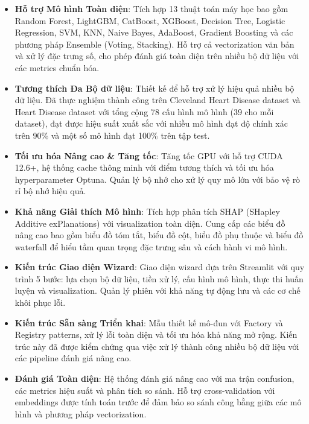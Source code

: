 \vspace{1em}
\begin{itemize}
    \item \textbf{Hỗ trợ Mô hình Toàn diện}: Tích hợp 13 thuật toán máy học bao gồm Random Forest, LightGBM, CatBoost, XGBoost, Decision Tree, Logistic Regression, SVM, KNN, Naive Bayes, AdaBoost, Gradient Boosting và các phương pháp Ensemble (Voting, Stacking). Hỗ trợ cả vectorization văn bản và xử lý đặc trưng số, cho phép đánh giá toàn diện trên nhiều bộ dữ liệu với các metrics chuẩn hóa.
    
    \item \textbf{Tương thích Đa Bộ dữ liệu}: Thiết kế để hỗ trợ xử lý hiệu quả nhiều bộ dữ liệu. Đã thực nghiệm thành công trên Cleveland Heart Disease dataset và Heart Disease dataset với tổng cộng 78 cấu hình mô hình (39 cho mỗi dataset), đạt được hiệu suất xuất sắc với nhiều mô hình đạt độ chính xác trên 90\% và một số mô hình đạt 100\% trên tập test.
    
    \item \textbf{Tối ưu hóa Nâng cao \& Tăng tốc}: Tăng tốc GPU với hỗ trợ CUDA 12.6+, hệ thống cache thông minh với điểm tương thích và tối ưu hóa hyperparameter Optuna. Quản lý bộ nhớ cho xử lý quy mô lớn với bảo vệ rò rỉ bộ nhớ hiệu quả.
    
    \item \textbf{Khả năng Giải thích Mô hình}: Tích hợp phân tích SHAP (SHapley Additive exPlanations) với visualization toàn diện. Cung cấp các biểu đồ nâng cao bao gồm biểu đồ tóm tắt, biểu đồ cột, biểu đồ phụ thuộc và biểu đồ waterfall để hiểu tầm quan trọng đặc trưng sâu và cách hành vi mô hình.
    
    \item \textbf{Kiến trúc Giao diện Wizard}: Giao diện wizard dựa trên Streamlit với quy trình 5 bước: lựa chọn bộ dữ liệu, tiền xử lý, cấu hình mô hình, thực thi huấn luyện và visualization. Quản lý phiên với khả năng tự động lưu và các cơ chế khôi phục lỗi.
    
    \item \textbf{Kiến trúc Sẵn sàng Triển khai}: Mẫu thiết kế mô-đun với Factory và Registry patterns, xử lý lỗi toàn diện và tối ưu hóa khả năng mở rộng. Kiến trúc này đã được kiểm chứng qua việc xử lý thành công nhiều bộ dữ liệu với các pipeline đánh giá nâng cao.
    
    \item \textbf{Đánh giá Toàn diện}: Hệ thống đánh giá nâng cao với ma trận confusion, các metrics hiệu suất và phân tích so sánh. Hỗ trợ cross-validation với embeddings được tính toán trước để đảm bảo so sánh công bằng giữa các mô hình và phương pháp vectorization.
\end{itemize}

